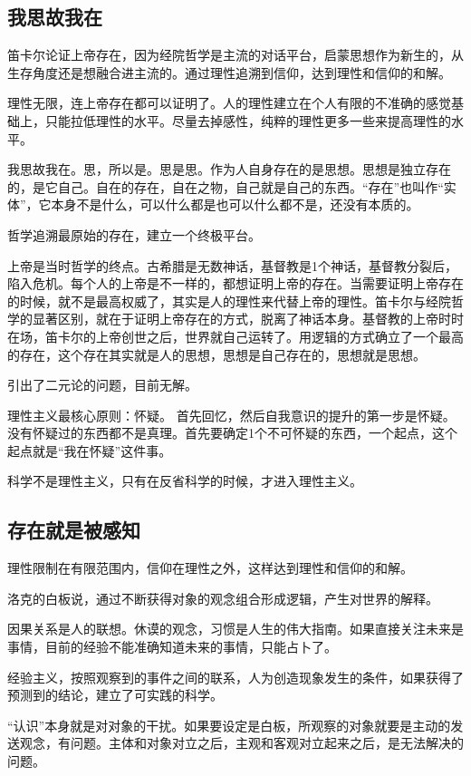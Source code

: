 \documentclass[UTF8]{../RepresentationUniverse}
\begin{document}
\subsection{我思故我在}

笛卡尔论证上帝存在，因为经院哲学是主流的对话平台，启蒙思想作为新生的，从生存角度还是想融合进主流的。通过理性追溯到信仰，达到理性和信仰的和解。

理性无限，连上帝存在都可以证明了。人的理性建立在个人有限的不准确的感觉基础上，只能拉低理性的水平。尽量去掉感性，纯粹的理性更多一些来提高理性的水平。

我思故我在。思，所以是。思是思。作为人自身存在的是思想。思想是独立存在的，是它自己。自在的存在，自在之物，自己就是自己的东西。“存在”也叫作“实体”，它本身不是什么，可以什么都是也可以什么都不是，还没有本质的。

哲学追溯最原始的存在，建立一个终极平台。

上帝是当时哲学的终点。古希腊是无数神话，基督教是1个神话，基督教分裂后，陷入危机。每个人的上帝是不一样的，都想证明上帝的存在。当需要证明上帝存在的时候，就不是最高权威了，其实是人的理性来代替上帝的理性。笛卡尔与经院哲学的显著区别，就在于证明上帝存在的方式，脱离了神话本身。基督教的上帝时时在场，笛卡尔的上帝创世之后，世界就自己运转了。用逻辑的方式确立了一个最高的存在，这个存在其实就是人的思想，思想是自己存在的，思想就是思想。

引出了二元论的问题，目前无解。

理性主义最核心原则：怀疑。
首先回忆，然后自我意识的提升的第一步是怀疑。没有怀疑过的东西都不是真理。首先要确定1个不可怀疑的东西，一个起点，这个起点就是“我在怀疑”这件事。

科学不是理性主义，只有在反省科学的时候，才进入理性主义。

\subsection{存在就是被感知}

理性限制在有限范围内，信仰在理性之外，这样达到理性和信仰的和解。

洛克的白板说，通过不断获得对象的观念组合形成逻辑，产生对世界的解释。

因果关系是人的联想。休谟的观念，习惯是人生的伟大指南。如果直接关注未来是事情，目前的经验不能准确知道未来的事情，只能占卜了。

经验主义，按照观察到的事件之间的联系，人为创造现象发生的条件，如果获得了预测到的结论，建立了可实践的科学。

“认识”本身就是对对象的干扰。如果要设定是白板，所观察的对象就要是主动的发送观念，有问题。主体和对象对立之后，主观和客观对立起来之后，是无法解决的问题。
\end{document}
